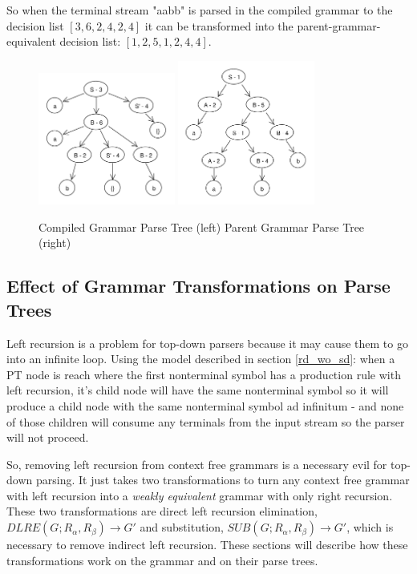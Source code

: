 \documentclass[11pt]{article}
\begin{document}
So when the terminal stream "aabb" is parsed in the compiled
grammar to the decision list $[3, 6, 2, 4, 2, 4]$ it can be transformed
into the parent-grammar-equivalent decision list: $[1, 2, 5, 1, 2, 4, 4]$.

\begin{figure}[h!]
    \centering
    \includegraphics[width=0.4\textwidth,natwidth=458,natheight=444]{umlet/compiled_ex.pdf}
    \includegraphics[width=0.4\textwidth,natwidth=472,natheight=500]{umlet/decompiled_ex.pdf}
    \caption{Compiled Grammar Parse Tree (left) Parent Grammar Parse Tree (right)}
    \label{fig:comp_to_dec_ex}
\end{figure}

\subsection{Effect of Grammar Transformations on Parse Trees}
\label{gram_transforms}
Left recursion is a problem for top-down parsers because it may cause them to
go into an infinite loop. Using the model described in section \ref{rd_wo_sd}:
when a PT node is reach where the first nonterminal symbol has a production rule with
left recursion, it's child node will have the same nonterminal symbol so it will produce
a child node with the same nonterminal symbol ad infinitum - and none of those children will
consume any terminals from the input stream so the parser will not proceed. 

So, removing left recursion from context free grammars is a necessary evil for top-down parsing.
It just takes two transformations to turn any context free grammar with left recursion
into a {\em weakly equivalent} grammar with only right recursion.
These two transformations are direct left recursion elimination, 
$DLRE(G; R_\alpha, R_\beta) \rightarrow G'$ and substitution, 
$SUB(G; R_\alpha, R_\beta) \rightarrow G'$, which is necessary to
remove indirect left recursion. \cite{aho, lewis}
These sections will describe how these transformations work on the grammar
and on their parse trees.
\end{document}
